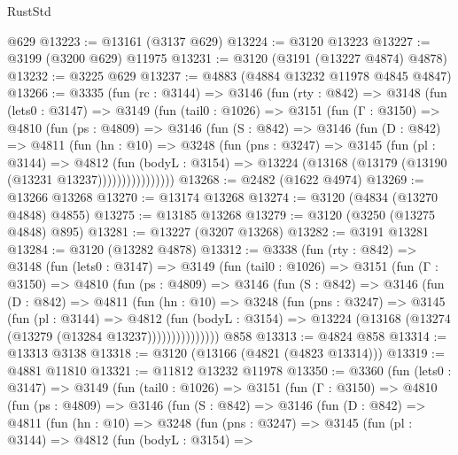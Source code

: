 \begin{lexlean}{RustStd}
\begin{coremodule}
{\begin{coremodule}
{{{{{{{{{{{{{{{{{{{{{{{{{{    @629
@13223 := @13161 (@3137 @629)
@13224 := @3120 @13223
@13227 := @3199 (@3200 @629) @11975
@13231 := @3120 (@3191 (@13227 @4874) @4878)
@13232 := @3225 @629
@13237 := @4883 (@4884 @13232 @11978 @4845 @4847)
@13266 := @3335
    (fun (rc : @3144) =>
    @3146
      (fun (rty : @842) =>
      @3148
        (fun (lets0 : @3147) =>
        @3149
          (fun (tail0 : @1026) =>
          @3151
            (fun (Γ : @3150) =>
            @4810
              (fun (ps : @4809) =>
              @3146
                (fun (S : @842) =>
                @3146
                  (fun (D : @842) =>
                  @4811
                    (fun (hn : @10) =>
                    @3248
                      (fun (pns : @3247) =>
                      @3145
                        (fun (pl : @3144) =>
                        @4812
                          (fun (bodyL : @3154) =>
                          @13224 (@13168 (@13179 (@13190 (@13231 @13237))))))))))))))))
@13268 := @2482 (@1622 @4974)
@13269 := @13266 @13268
@13270 := @13174 @13268
@13274 := @3120 (@4834 (@13270 @4848) @4855)
@13275 := @13185 @13268
@13279 := @3120 (@3250 (@13275 @4848) @895)
@13281 := @13227 (@3207 @13268)
@13282 := @3191 @13281
@13284 := @3120 (@13282 @4878)
@13312 := @3338
    (fun (rty : @842) =>
    @3148
      (fun (lets0 : @3147) =>
      @3149
        (fun (tail0 : @1026) =>
        @3151
          (fun (Γ : @3150) =>
          @4810
            (fun (ps : @4809) =>
            @3146
              (fun (S : @842) =>
              @3146
                (fun (D : @842) =>
                @4811
                  (fun (hn : @10) =>
                  @3248
                    (fun (pns : @3247) =>
                    @3145
                      (fun (pl : @3144) =>
                      @4812
                        (fun (bodyL : @3154) =>
                        @13224 (@13168 (@13274 (@13279 (@13284 @13237)))))))))))))))
    @858
@13313 := @4824 @858
@13314 := @13313 @3138
@13318 := @3120 (@13166 (@4821 (@4823 @13314)))
@13319 := @4881 @11810
@13321 := @11812 @13232 @11978
@13350 := @3360
    (fun (lets0 : @3147) =>
    @3149
      (fun (tail0 : @1026) =>
      @3151
        (fun (Γ : @3150) =>
        @4810
          (fun (ps : @4809) =>
          @3146
            (fun (S : @842) =>
            @3146
              (fun (D : @842) =>
              @4811
                (fun (hn : @10) =>
                @3248
                  (fun (pns : @3247) =>
                  @3145
                    (fun (pl : @3144) =>
                    @4812
                      (fun (bodyL : @3154) =>
}}}}}}}}}}}}}}}}}}}}}}}}}}
\end{coremodule}}
\end{coremodule}
\end{lexlean}
